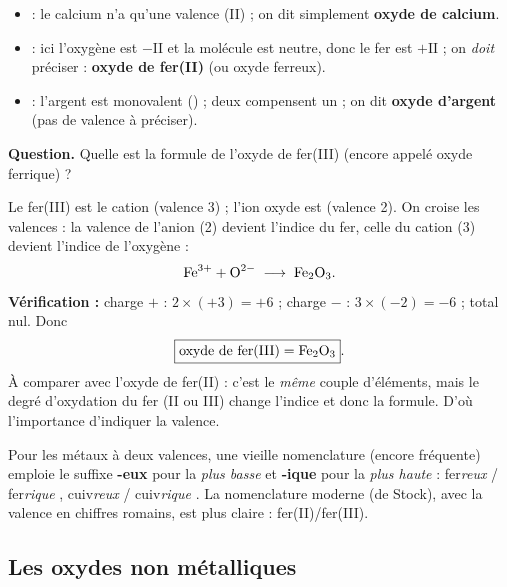\documentclass[11pt,a4paper]{article}
\begin{document}
\begin{exemple}
\begin{itemize}[leftmargin=1.6em,topsep=2pt,itemsep=2pt]
  \item {} : le calcium n'a qu'une valence (II) ; on dit simplement \textbf{oxyde de calcium}.
  \item {} : ici l'oxygène est $-\mathrm{II}$ et la molécule est neutre, donc le fer est $+\mathrm{II}$ ;
        on \emph{doit} préciser : \textbf{oxyde de fer(II)} (ou oxyde ferreux).
  \item {} : l'argent est monovalent () ; deux  compensent un  ;
        on dit \textbf{oxyde d'argent} (pas de valence à préciser).
\end{itemize}
\end{exemple}

\begin{exemple}
\textbf{Question.} Quelle est la formule de l'oxyde de fer(III) (encore appelé oxyde ferrique) ?

\smallskip
Le fer(III) est le cation  (valence 3) ; l'ion oxyde est  (valence 2). On croise les
valences : la valence de l'anion (2) devient l'indice du fer, celle du cation (3) devient l'indice de
l'oxygène :
\[ \ce{Fe^3+} + \ce{O^2-} \;\longrightarrow\; \ce{Fe2O3}. \]
\textbf{Vérification :} charge $+$ : $2\times(+3)=+6$ ; charge $-$ : $3\times(-2)=-6$ ; total nul. Donc
\[ \boxed{\text{oxyde de fer(III)} = \ce{Fe2O3}}. \]
À comparer avec l'oxyde de fer(II)  : c'est le \emph{même} couple d'éléments, mais le degré
d'oxydation du fer (II ou III) change l'indice et donc la formule. D'où l'importance d'indiquer la valence.
\end{exemple}

\begin{remarque}
Pour les métaux à deux valences, une vieille nomenclature (encore fréquente) emploie le suffixe
\textbf{-eux} pour la \emph{plus basse} et \textbf{-ique} pour la \emph{plus haute} : fer\emph{reux}
 / fer\emph{rique} , cuiv\emph{reux}  / cuiv\emph{rique} . La
nomenclature moderne (de Stock), avec la valence en chiffres romains, est plus claire : fer(II)/fer(III).
\end{remarque}

\subsection{Les oxydes non métalliques}
\end{document}

